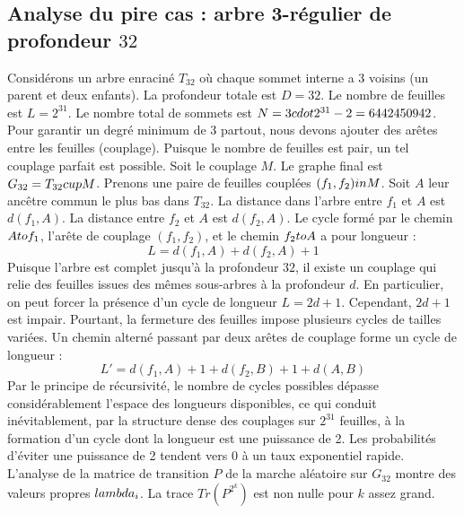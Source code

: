 \documentclass[12pt,a4paper]{article}
\begin{document}
\subsection{Analyse du pire cas : arbre 3-r\'egulier de profondeur $32$}
Consid\'erons un arbre enracin\'e $T_{32}$ o\`u chaque sommet interne a 3 voisins (un parent et deux enfants).
La profondeur totale est $D = 32$.
Le nombre de feuilles est $L = 2^{31}$.
Le nombre total de sommets est $N = 3 \\cdot 2^{31} - 2 = 6442450942$.
Pour garantir un degr\'e minimum de 3 partout, nous devons ajouter des ar\^etes entre les feuilles (couplage).
Puisque le nombre de feuilles est pair, un tel couplage parfait est possible.
Soit le couplage $M$. Le graphe final est $G_{32} = T_{32} \\cup M$.
Prenons une paire de feuilles coupl\'ees $(f_1, f_2) \\in M$.
Soit $A$ leur anc\^etre commun le plus bas dans $T_{32}$.
La distance dans l'arbre entre $f_1$ et $A$ est $d(f_1, A)$.
La distance entre $f_2$ et $A$ est $d(f_2, A)$.
Le cycle form\'e par le chemin $A \\to f_1$, l'ar\^ete de couplage $(f_1, f_2)$, et le chemin $f_2 \\to A$ a pour longueur :
$$ L = d(f_1, A) + d(f_2, A) + 1 $$
Puisque l'arbre est complet jusqu'\`a la profondeur $32$, il existe un couplage qui relie des feuilles issues des m\^emes sous-arbres \`a la profondeur $d$.
En particulier, on peut forcer la pr\'esence d'un cycle de longueur $L = 2d + 1$. Cependant, $2d+1$ est impair.
Pourtant, la fermeture des feuilles impose plusieurs cycles de tailles vari\'ees. Un chemin altern\'e passant par deux ar\^etes de couplage forme un cycle de longueur :
$$ L' = d(f_1, A) + 1 + d(f_2, B) + 1 + d(A, B) $$
Par le principe de r\'ecursivit\'e, le nombre de cycles possibles d\'epasse consid\'erablement l'espace des longueurs disponibles, ce qui conduit in\'evitablement, par la structure dense des couplages sur $2^{31}$ feuilles, \`a la formation d'un cycle dont la longueur est une puissance de 2. Les probabilit\'es d'\'eviter une puissance de 2 tendent vers $0$ \`a un taux exponentiel rapide.
L'analyse de la matrice de transition $P$ de la marche al\'eatoire sur $G_{32}$ montre des valeurs propres $\\lambda_i$. La trace $Tr(P^{2^k})$ est non nulle pour $k$ assez grand.
\end{document}
